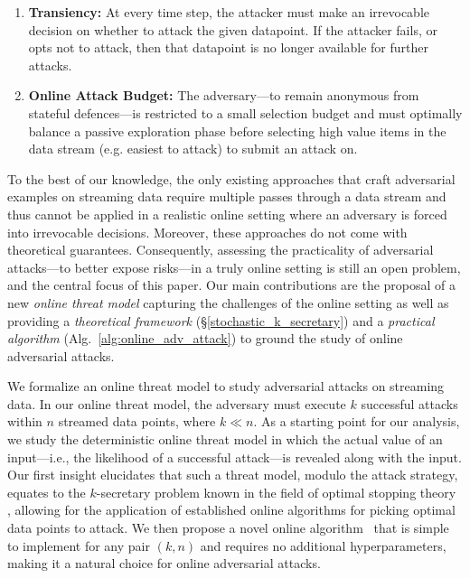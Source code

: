 \begin{enumerate}[noitemsep,topsep=0pt,parsep=0pt,partopsep=0pt, leftmargin=*] 
    \item \textbf{Transiency:} At every time step, the attacker must make an irrevocable decision on whether to attack the given datapoint. If the attacker fails, or opts not to attack, then that datapoint is no longer available for further attacks.
    \item \textbf{Online Attack Budget:} The adversary---to remain anonymous from stateful defences---is restricted to a small selection budget and must optimally balance a passive exploration phase before selecting high value items in the data stream (e.g. easiest to attack) to submit an attack on.
\end{enumerate}

To the best of our knowledge, the only existing approaches that craft adversarial examples on streaming data \citep{gong2019real,lin2017tactics,sun2020stealthy} require multiple passes through a data stream and thus cannot be applied in a realistic online setting where an adversary is forced into irrevocable decisions. Moreover, these approaches do not come with theoretical guarantees. Consequently, assessing the practicality of adversarial attacks---to better expose risks---in a truly online setting is still an open problem, and the central focus of this paper. Our main contributions are the proposal of a new \emph{online threat model} capturing the challenges of the online setting as well as providing a \emph{theoretical framework} (\S\ref{stochastic_k_secretary}) and a \emph{practical algorithm} (Alg.~\ref{alg:online_adv_attack}) to ground the study of online adversarial attacks. 


We formalize an online threat model to study adversarial attacks on streaming data. In our online threat model, the adversary must execute $k$ successful attacks within $n$  streamed data points, where $k \ll n$. As a starting point for our analysis, we study the deterministic online threat model in which the actual value of an input---i.e., the likelihood of a successful attack---is revealed along with the input. Our first insight elucidates that such a threat model, modulo the attack strategy, equates to the $k$-secretary problem known in the field of optimal stopping theory \cite{dynkin1963optimum,kleinberg2005multiple}, allowing for the application of established online algorithms for picking optimal data points to attack. We then propose a novel online algorithm \algoname\ that is simple to implement for any pair $(k,n)$ and requires no additional hyperparameters, making it a natural choice for online adversarial attacks.
 

